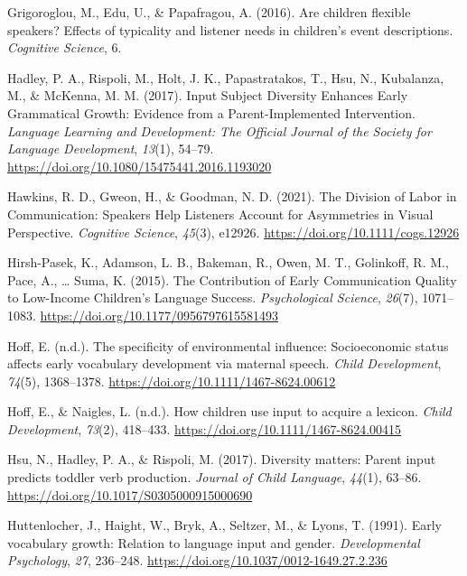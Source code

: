 \documentclass[english,man]{apa6}
\begin{document}
\leavevmode\hypertarget{ref-grigoroglou2016}{}%
Grigoroglou, M., Edu, U., \& Papafragou, A. (2016). Are children flexible speakers? Effects of typicality and listener needs in children's event descriptions. \emph{Cognitive Science}, 6.

\leavevmode\hypertarget{ref-hadley2017}{}%
Hadley, P. A., Rispoli, M., Holt, J. K., Papastratakos, T., Hsu, N., Kubalanza, M., \& McKenna, M. M. (2017). Input Subject Diversity Enhances Early Grammatical Growth: Evidence from a Parent-Implemented Intervention. \emph{Language Learning and Development: The Official Journal of the Society for Language Development}, \emph{13}(1), 54--79. \url{https://doi.org/10.1080/15475441.2016.1193020}

\leavevmode\hypertarget{ref-hawkins2021}{}%
Hawkins, R. D., Gweon, H., \& Goodman, N. D. (2021). The Division of Labor in Communication: Speakers Help Listeners Account for Asymmetries in Visual Perspective. \emph{Cognitive Science}, \emph{45}(3), e12926. \url{https://doi.org/10.1111/cogs.12926}

\leavevmode\hypertarget{ref-hirsh-pasek2015}{}%
Hirsh-Pasek, K., Adamson, L. B., Bakeman, R., Owen, M. T., Golinkoff, R. M., Pace, A., \ldots{} Suma, K. (2015). The Contribution of Early Communication Quality to Low-Income Children's Language Success. \emph{Psychological Science}, \emph{26}(7), 1071--1083. \url{https://doi.org/10.1177/0956797615581493}

\leavevmode\hypertarget{ref-hoff2003}{}%
Hoff, E. (n.d.). The specificity of environmental influence: Socioeconomic status affects early vocabulary development via maternal speech. \emph{Child Development}, \emph{74}(5), 1368--1378. \url{https://doi.org/10.1111/1467-8624.00612}

\leavevmode\hypertarget{ref-hoff2002}{}%
Hoff, E., \& Naigles, L. (n.d.). How children use input to acquire a lexicon. \emph{Child Development}, \emph{73}(2), 418--433. \url{https://doi.org/10.1111/1467-8624.00415}

\leavevmode\hypertarget{ref-hsu2017}{}%
Hsu, N., Hadley, P. A., \& Rispoli, M. (2017). Diversity matters: Parent input predicts toddler verb production. \emph{Journal of Child Language}, \emph{44}(1), 63--86. \url{https://doi.org/10.1017/S0305000915000690}

\leavevmode\hypertarget{ref-huttenlocher1991}{}%
Huttenlocher, J., Haight, W., Bryk, A., Seltzer, M., \& Lyons, T. (1991). Early vocabulary growth: Relation to language input and gender. \emph{Developmental Psychology}, \emph{27}, 236--248. \url{https://doi.org/10.1037/0012-1649.27.2.236}
\end{document}
